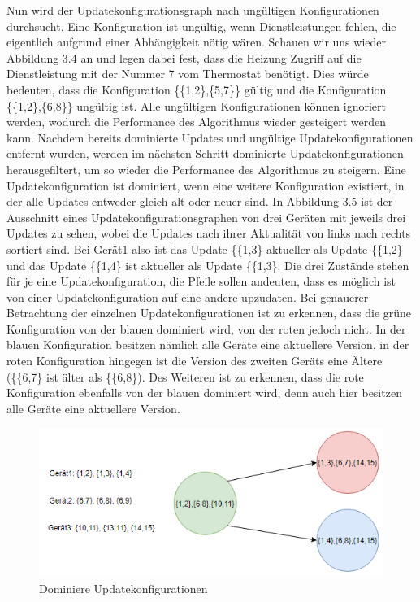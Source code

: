 Nun wird der Updatekonfigurationsgraph nach ungültigen Konfigurationen durchsucht. Eine Konfiguration ist ungültig, wenn
Dienstleistungen fehlen, die eigentlich aufgrund einer Abhängigkeit nötig wären. 
Schauen wir uns wieder Abbildung 3.4 an und legen dabei
fest, dass die Heizung Zugriff auf die Dienstleistung mit der Nummer 7 vom Thermostat benötigt. Dies würde bedeuten, dass die Konfiguration
\{\{1,2\},\{5,7\}\} gültig und die Konfiguration \{\{1,2\},\{6,8\}\} ungültig ist. Alle ungültigen Konfigurationen können ignoriert werden, wodurch
die Performance des Algorithmus wieder gesteigert werden kann.
Nachdem bereits dominierte Updates und ungültige Updatekonfigurationen entfernt wurden, werden im nächsten Schritt dominierte Updatekonfigurationen
herausgefiltert, um so wieder die
Performance des Algorithmus zu steigern. Eine Updatekonfiguration ist dominiert, wenn eine weitere Konfiguration existiert, in der alle Updates entweder
gleich alt oder neuer sind. In Abbildung 3.5 ist der Ausschnitt eines Updatekonfigurationsgraphen von drei Geräten mit jeweils drei Updates zu sehen, wobei die Updates
nach ihrer Aktualität von links nach rechts sortiert sind. Bei Gerät1 also ist das Update \{\{1,3\} aktueller als Update \{\{1,2\} und das Update \{\{1,4\} ist aktueller
als Update \{\{1,3\}. Die drei Zustände stehen für je eine Updatekonfiguration, die Pfeile sollen andeuten, dass es möglich ist von einer Updatekonfiguration auf
eine andere upzudaten. Bei genauerer Betrachtung der einzelnen Updatekonfigurationen ist zu erkennen, dass die grüne Konfiguration von der blauen dominiert wird,
von der roten jedoch nicht. In der blauen Konfiguration besitzen nämlich alle Geräte eine aktuellere Version, in der roten Konfiguration hingegen ist die Version des
zweiten Geräts eine Ältere (\{\{6,7\} ist älter als \{\{6,8\}). Des Weiteren ist zu erkennen, dass die rote Konfiguration ebenfalls von der blauen dominiert
wird, denn auch hier besitzen alle Geräte eine aktuellere Version.
\begin{figure}[!h]
\begin{center}
\includegraphics{"images/Dominierte Konfig"}
\caption{Dominiere Updatekonfigurationen}
\label{fig:Prob1:MEA}
\end{center}
\end{figure}

